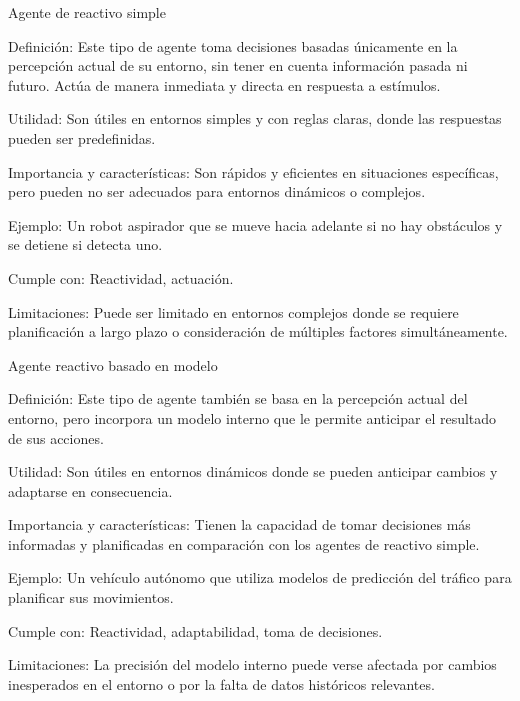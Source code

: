 \begin{myitemize}
    \item Agente de reactivo simple
    \begin{myitemize}
        \item Definición: Este tipo de agente toma decisiones basadas únicamente en la percepción actual de su entorno, sin tener en cuenta información pasada ni futuro. Actúa de manera inmediata y directa en respuesta a estímulos.
        \item Utilidad: Son útiles en entornos simples y con reglas claras, donde las respuestas pueden ser predefinidas.
        \item Importancia y características: Son rápidos y eficientes en situaciones específicas, pero pueden no ser adecuados para entornos dinámicos o complejos.
        \item Ejemplo: Un robot aspirador que se mueve hacia adelante si no hay obstáculos y se detiene si detecta uno.
        \item Cumple con: Reactividad, actuación.
        \item Limitaciones: Puede ser limitado en entornos complejos donde se requiere planificación a largo plazo o consideración de múltiples factores simultáneamente.
    \end{myitemize}
    
    \item Agente reactivo basado en modelo    
    \begin{myitemize}
        \item Definición: Este tipo de agente también se basa en la percepción actual del entorno, pero incorpora un modelo interno que le permite anticipar el resultado de sus acciones.
        \item Utilidad: Son útiles en entornos dinámicos donde se pueden anticipar cambios y adaptarse en consecuencia.
        \item Importancia y características: Tienen la capacidad de tomar decisiones más informadas y planificadas en comparación con los agentes de reactivo simple.
        \item Ejemplo: Un vehículo autónomo que utiliza modelos de predicción del tráfico para planificar sus movimientos.
        \item Cumple con: Reactividad, adaptabilidad, toma de decisiones.
        \item Limitaciones: La precisión del modelo interno puede verse afectada por cambios inesperados en el entorno o por la falta de datos históricos relevantes.                
    \end{myitemize}


\end{myitemize}
